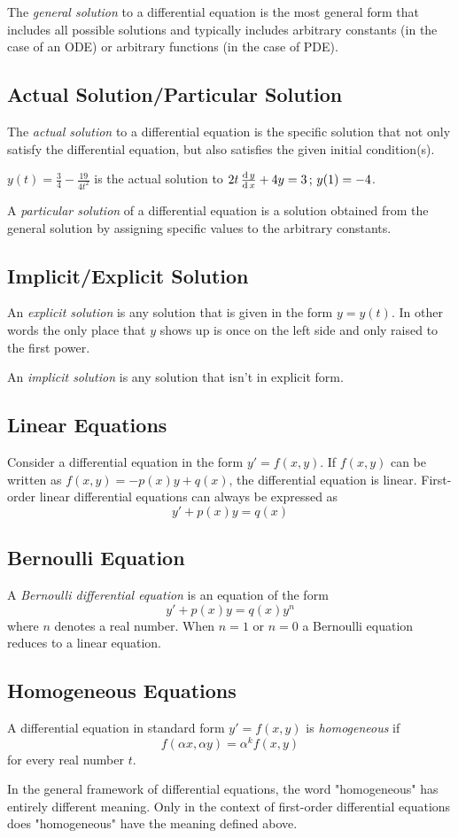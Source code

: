 \documentclass[12pt,oneside,a4paper]{article}
\begin{document}
The \emph{general solution} to a differential equation is the most general form that includes all possible solutions and typically includes arbitrary constants (in the case of an ODE) or arbitrary functions (in the case of PDE).
\subsection{Actual Solution/Particular Solution}
The \emph{actual solution} to a differential equation is the specific solution that not only satisfy the differential equation, but also satisfies the given initial condition(s).
\begin{ex}
    $ y(t)=\frac{3}{4}-\frac{19}{4t^2} $ is the actual solution to $ 2t\,\frac{\mathrm{d}\,y}{\mathrm{d}\,x}+4y=3 \,;\,y(1)=-4$.
\end{ex}
A \emph{particular solution} of a differential equation is a solution obtained from the general solution by assigning specific values to the arbitrary constants.
\subsection{Implicit/Explicit Solution}
An \emph{explicit solution} is any solution that is given in the form $ y=y(t) $. In other words the only place that $ y $ shows up is once on the left side and only raised to the first power.

An \emph{implicit solution} is any solution that isn't in explicit form.
\subsection{Linear Equations}
Consider a differential equation in the form $ y'=f(x,y) $. If $ f(x,y) $ can be written as $ f(x,y)=-p(x)y+q(x) $, the differential equation is linear. First-order linear differential equations can always be expressed as
\[y'+p(x)y=q(x)\]
\subsection{Bernoulli Equation}
A \emph{Bernoulli differential equation} is an equation of the form
\[y'+p(x)y=q(x)y^n\]
where $ n $ denotes a real number. When $ n=1 $ or $ n=0 $ a Bernoulli equation reduces to a linear equation.
\subsection{Homogeneous Equations}
A differential equation in standard form $ y'=f(x,y) $ is \emph{homogeneous} if
\[f(\alpha x,\alpha y)=\alpha^k f(x,y)\]
for every real number $ t $.
\begin{rem}
    In the general framework of differential equations, the word "homogeneous" has entirely different meaning. Only in the context of first-order differential equations does "homogeneous" have the meaning defined above.
\end{rem}
\end{document}
